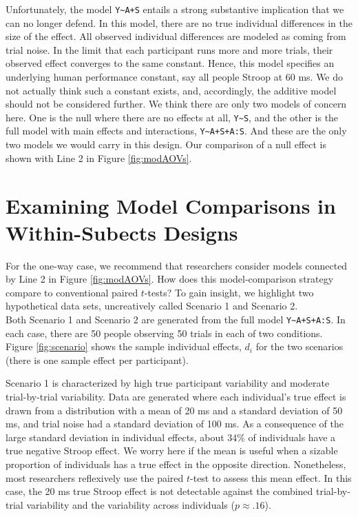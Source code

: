 \documentclass[
  english,
  ,man]{apa6}
\begin{document}
Unfortunately, the model \texttt{Y\textasciitilde{}A+S} entails a strong substantive implication that we can no longer defend. In this model, there are no true individual differences in the size of the effect. All observed individual differences are modeled as coming from trial noise. In the limit that each participant runs more and more trials, their observed effect converges to the same constant. Hence, this model specifies an underlying human performance constant, say all people Stroop at 60 ms. We do not actually think such a constant exists, and, accordingly, the additive model should not be considered further. We think there are only two models of concern here. One is the null where there are no effects at all, \texttt{Y\textasciitilde{}S}, and the other is the full model with main effects and interactions, \texttt{Y\textasciitilde{}A+S+A:S}. And these are the only two models we would carry in this design. Our comparison of a null effect is shown with Line 2 in Figure \ref{fig:modAOVs}.

\hypertarget{examining-model-comparisons-in-within-subects-designs}{%
\section{Examining Model Comparisons in Within-Subects Designs}\label{examining-model-comparisons-in-within-subects-designs}}

For the one-way case, we recommend that researchers consider models connected by Line 2 in Figure \ref{fig:modAOVs}. How does this model-comparison strategy compare to conventional paired \(t\)-tests? To gain insight, we highlight two hypothetical data sets, uncreatively called Scenario 1 and Scenario 2.\\
Both Scenario 1 and Scenario 2 are generated from the full model \texttt{Y\textasciitilde{}A+S+A:S}. In each case, there are 50 people observing 50 trials in each of two conditions. Figure \ref{fig:scenario} shows the sample individual effects, \(d_i\) for the two scenarios (there is one sample effect per participant).

Scenario 1 is characterized by high true participant variability and moderate trial-by-trial variability. Data are generated where each individual's true effect is drawn from a distribution with a mean of 20 ms and a standard deviation of 50 ms, and trial noise had a standard deviation of 100 ms. As a consequence of the large standard deviation in individual effects, about 34\% of individuals have a true negative Stroop effect. We worry here if the mean is useful when a sizable proportion of individuals has a true effect in the opposite direction. Nonetheless, most researchers reflexively use the paired \(t\)-test to assess this mean effect. In this case, the 20 ms true Stroop effect is not detectable against the combined trial-by-trial variability and the variability across individuals (\(p \approx .16\)).
\end{document}
